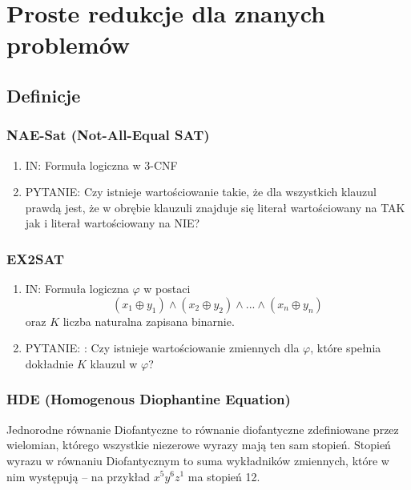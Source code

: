 \section{Proste redukcje dla znanych problemów}



\subsection{Definicje}

\subsubsection{NAE-Sat (Not-All-Equal SAT)}

\begin{enumerate}
	\item \textsc{IN:} Formuła logiczna w 3-CNF
	\item \textsc{PYTANIE:}  Czy istnieje wartościowanie takie, że dla wszystkich klauzul prawdą jest, że w obrębie klauzuli znajduje się literał wartościowany na \textsc{TAK} jak i literał wartościowany na \textsc{NIE}?
\end{enumerate}

\subsubsection{EX2SAT}

\begin{enumerate}
	\item IN: Formuła logiczna \(\varphi\) w postaci
	      \[  (x_1 \oplus y_1 ) \land (x_2 \oplus y_2) \land ... \land (x_n \oplus y_n)
	      \]
	      oraz \( K \) liczba naturalna zapisana binarnie.
	\item PYTANIE: : Czy istnieje wartościowanie zmiennych dla \(\varphi\), które spełnia dokładnie
	      \(K\) klauzul w \(\varphi\)?
\end{enumerate}

\subsubsection{HDE (Homogenous Diophantine Equation)}

\begin{definition}
	Jednorodne równanie Diofantyczne to równanie diofantyczne zdefiniowane przez wielomian, którego wszystkie niezerowe wyrazy mają ten sam stopień. Stopień wyrazu w równaniu Diofantycznym to suma wykładników zmiennych, które w nim występują -- na przykład \( x^5y^6z^1 \) ma stopień 12.
\end{definition}

